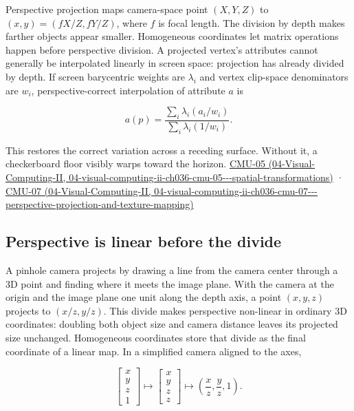 Perspective projection maps camera-space point \((X,Y,Z)\) to \((x,y)=(fX/Z,fY/Z)\), where \(f\) is focal length. The division by depth makes farther objects appear smaller. Homogeneous coordinates let matrix operations happen before perspective division. A projected vertex's attributes cannot generally be interpolated linearly in screen space: projection has already divided by depth. If screen barycentric weights are \(\lambda_i\) and vertex clip-space denominators are \(w_i\), perspective-correct interpolation of attribute \(a\) is

\[
a(p)=\frac{\sum_i\lambda_i(a_i/w_i)}{\sum_i\lambda_i(1/w_i)}.
\]

This restores the correct variation across a receding surface. Without it, a checkerboard floor visibly warps toward the horizon. \href{../04-Visual-Computing-II/main.pdf\#nameddest=04-visual-computing-ii-ch036-cmu-05---spatial-transformations}{CMU-05 (04-Visual-Computing-II, 04-visual-computing-ii-ch036-cmu-05-\/-\/-spatial-transformations)} · \href{../04-Visual-Computing-II/main.pdf\#nameddest=04-visual-computing-ii-ch036-cmu-07---perspective-projection-and-texture-mapping}{CMU-07 (04-Visual-Computing-II, 04-visual-computing-ii-ch036-cmu-07-\/-\/-perspective-projection-and-texture-mapping)}

\subsection{Perspective is linear before the divide}\label{03-visual-computing-i-ch003-perspective-is-linear-before-the-divide}

A pinhole camera projects by drawing a line from the camera center through a 3D point and finding where it meets the image plane. With the camera at the origin and the image plane one unit along the depth axis, a point \((x,y,z)\) projects to \((x/z,y/z)\). This divide makes perspective non-linear in ordinary 3D coordinates: doubling both object size and camera distance leaves its projected size unchanged. Homogeneous coordinates store that divide as the final coordinate of a linear map. In a simplified camera aligned to the axes,

\[
\begin{bmatrix}x\\y\\z\\1\end{bmatrix}
\longmapsto
\begin{bmatrix}x\\y\\z\\z\end{bmatrix}
\longmapsto
\left(\frac{x}{z},\frac{y}{z},1\right).
\]

